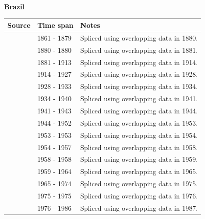 \documentclass[12pt,a4paper,landscape]{article}
\begin{document}
\begin{adjustbox}{max totalsize={\paperwidth}{\paperheight},center}
\begin{minipage}[t][\textheight][t]{\textwidth}
\vspace*{0.5cm}
{}
\begin{center}
{\Large\bfseries Brazil}
\end{center}
\vspace{0.5cm}
\begin{table}[H]
\centering
\small
\begin{tabular}{|l|l|l|}
\hline
\textbf{Source} & \textbf{Time span} & \textbf{Notes} \\
\hline
\rowcolor{white}\cite{Mitchell}& 1861 - 1879 &Spliced using overlapping data in 1880.\\
\rowcolor{lightgray}\cite{FZ}& 1880 - 1880 &Spliced using overlapping data in 1881.\\
\rowcolor{white}\cite{IMF_FPP}& 1881 - 1913 &Spliced using overlapping data in 1914.\\
\rowcolor{lightgray}\cite{Mitchell}& 1914 - 1927 &Spliced using overlapping data in 1928.\\
\rowcolor{white}\cite{IMF_FPP}& 1928 - 1933 &Spliced using overlapping data in 1934.\\
\rowcolor{lightgray}\cite{Mitchell}& 1934 - 1940 &Spliced using overlapping data in 1941.\\
\rowcolor{white}\cite{IMF_FPP}& 1941 - 1943 &Spliced using overlapping data in 1944.\\
\rowcolor{lightgray}\cite{Mitchell}& 1944 - 1952 &Spliced using overlapping data in 1953.\\
\rowcolor{white}\cite{IMF_FPP}& 1953 - 1953 &Spliced using overlapping data in 1954.\\
\rowcolor{lightgray}\cite{Mitchell}& 1954 - 1957 &Spliced using overlapping data in 1958.\\
\rowcolor{white}\cite{IMF_FPP}& 1958 - 1958 &Spliced using overlapping data in 1959.\\
\rowcolor{lightgray}\cite{Mitchell}& 1959 - 1964 &Spliced using overlapping data in 1965.\\
\rowcolor{white}\cite{IMF_FPP}& 1965 - 1974 &Spliced using overlapping data in 1975.\\
\rowcolor{lightgray}\cite{Mitchell}& 1975 - 1975 &Spliced using overlapping data in 1976.\\
\rowcolor{white}\cite{IMF_FPP}& 1976 - 1986 &Spliced using overlapping data in 1987.\\

\end{tabular}
\end{table}
\end{minipage}
\end{adjustbox}
\end{document}
